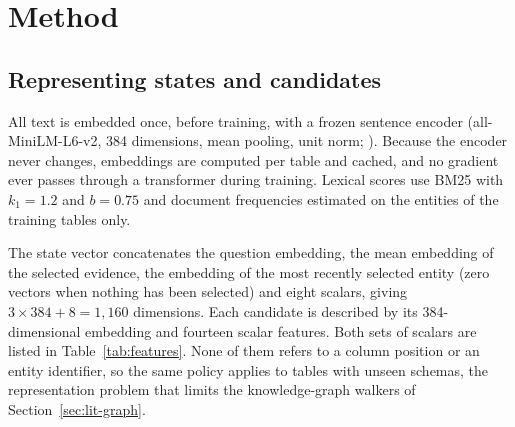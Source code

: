 \chapter{Method}
\label{ch:method}

\section{Representing states and candidates}
\label{sec:features}

All text is embedded once, before training, with a frozen sentence encoder (all-MiniLM-L6-v2, 384 dimensions, mean pooling, unit norm; \citealp{reimers-gurevych-2019-sentence,wang2020minilm}). Because the encoder never changes, embeddings are computed per table and cached, and no gradient ever passes through a transformer during training. Lexical scores use BM25 \citep{robertson2009bm25} with $k_1=1.2$ and $b=0.75$ and document frequencies estimated on the entities of the training tables only.

The state vector concatenates the question embedding, the mean embedding of the selected evidence, the embedding of the most recently selected entity (zero vectors when nothing has been selected) and eight scalars, giving $3\times384+8=1{,}160$ dimensions. Each candidate is described by its 384-dimensional embedding and fourteen scalar features. Both sets of scalars are listed in Table~\ref{tab:features}. None of them refers to a column position or an entity identifier, so the same policy applies to tables with unseen schemas, the representation problem that limits the knowledge-graph walkers of Section~\ref{sec:lit-graph}.

